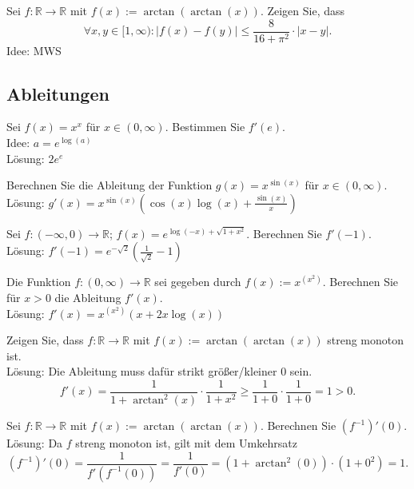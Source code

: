 Sei $f : \mathbb{R} \to \mathbb{R}$ mit $f(x) := \arctan(\arctan(x))$.
Zeigen Sie, dass
\begin{displaymath}
  \forall x,y \in [1,\infty) : |f(x) - f(y)| \leq \frac{8}{16 + \pi^2} \cdot |x-y|.
\end{displaymath}
Idee: MWS 

\subsection{Ableitungen}
Sei $f(x) = x^x$ für $x \in (0,\infty)$.
Bestimmen Sie $f'(e)$.\\
Idee: $a = e^{\log(a)}$\\
Lösung: $2e^e$

Berechnen Sie die Ableitung der Funktion $g(x) = x^{\sin(x)}$ für $x \in (0,\infty)$.\\
Lösung: $g'(x) = x^{\sin(x)} \left(\cos(x)\log(x) + \frac{\sin(x)}{x}\right)$

Sei $f : (-\infty, 0) \to \mathbb{R}$; $f(x) = e^{\log(-x) + \sqrt{1 + x^2}}$.
Berechnen Sie $f'(-1)$.\\
Lösung: $f'(-1) = e^{-\sqrt{2}}\left(\frac{1}{\sqrt{2}} - 1\right)$

Die Funktion $f:(0,\infty) \to \mathbb{R}$ sei gegeben durch $f(x) := x^{(x^2)}$.
Berechnen Sie für $x > 0$ die Ableitung $f'(x)$.\\
Lösung: $f'(x) = x^{(x^2)} (x + 2x\log(x))$

Zeigen Sie, dass $f : \mathbb{R} \to \mathbb{R}$ mit $f(x) := \arctan(\arctan(x))$ streng monoton ist.\\
Lösung:
Die Ableitung muss dafür strikt größer/kleiner 0 sein.
\begin{displaymath}
  f'(x) = \frac{1}{1 + \arctan^2(x)} \cdot \frac{1}{1 + x^2} \geq \frac{1}{1 + 0} \cdot \frac{1}{1 + 0} = 1  > 0.
\end{displaymath}

Sei $f : \mathbb{R} \to \mathbb{R}$ mit $f(x) := \arctan(\arctan(x))$.
Berechnen Sie $(f^{-1})'(0)$.\\
Lösung:
Da $f$ streng monoton ist, gilt mit dem Umkehrsatz
\begin{displaymath}
  (f^{-1})'(0) = \frac{1}{f'(f^{-1}(0))} = \frac{1}{f'(0)} = (1 + \arctan^2(0)) \cdot (1 + 0^2) = 1.
\end{displaymath}

